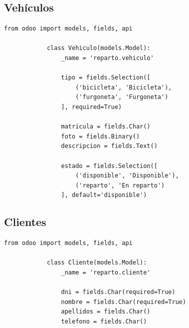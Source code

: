 \documentclass[a4paper, 11pt]{article}
\begin{document}
    \subsection{Vehículos}
        \begin{lstlisting}[frame=single,breaklines=true]
            from odoo import models, fields, api

            class Vehiculo(models.Model):
                _name = 'reparto.vehiculo'

                tipo = fields.Selection([
                    ('bicicleta', 'Bicicleta'),
                    ('furgoneta', 'Furgoneta')
                ], required=True)

                matricula = fields.Char()
                foto = fields.Binary()
                descripcion = fields.Text()

                estado = fields.Selection([
                    ('disponible', 'Disponible'),
                    ('reparto', 'En reparto')
                ], default='disponible')

        \end{lstlisting}

    \subsection{Clientes}
        \begin{lstlisting}[frame=single,breaklines=true]
            from odoo import models, fields, api

            class Cliente(models.Model):
                _name = 'reparto.cliente'

                dni = fields.Char(required=True)
                nombre = fields.Char(required=True)
                apellidos = fields.Char()
                telefono = fields.Char()
        \end{lstlisting}
\end{document}
